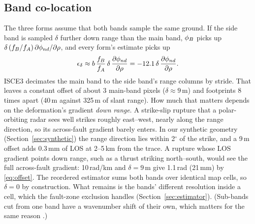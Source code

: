 \subsection{Band co-location}
\label{sec:colocation}
The three forms assume that both bands sample the same ground. If the side band is sampled $\delta$ further down range
than the main band, $\phi_B$ picks up $\delta\,(f_B/f_A)\,\partial\phi_{nd}/\partial\rho$, and every form's estimate
picks up
\begin{equation}
  \epsilon_\delta \approx b\,\frac{f_B}{f_A}\,\delta\,\frac{\partial\phi_{nd}}{\partial\rho}
  = -12.1\,\delta\,\frac{\partial\phi_{nd}}{\partial\rho} .
  \label{eq:offset}
\end{equation}
ISCE3 decimates the main band to the side band's range columns by stride. That leaves a constant offset of about 3 main-band pixels ($\delta\approx9$\,m) and footprints 8 times apart (40\,m against 325\,m of slant range). How much that matters depends on the deformation's gradient \emph{down range}. A strike-slip rupture that a polar-orbiting radar sees well strikes roughly east--west, nearly along the range direction, so its across-fault gradient barely enters. In our synthetic geometry (Section~\ref{sec:synthetic}) the range direction lies within 2$^\circ$ of the strike, and a 9\,m offset adds 0.3\,mm of LOS at 2--5\,km from the trace. A rupture whose LOS gradient points down range, such as a thrust striking north--south, would see the full across-fault gradient: 10\,rad/km and $\delta = 9$\,m give 1.1\,rad (21\,mm) by \eqref{eq:offset}. The reordered estimator sums both bands over identical map cells, so $\delta=0$ by construction. What remains is the bands' different resolution inside a cell, which the fault-zone exclusion handles (Section~\ref{sec:estimator}). (Sub-bands cut from one band have a wavenumber shift of their own, which matters for the same reason \citep{li2024wavenumber}.)
